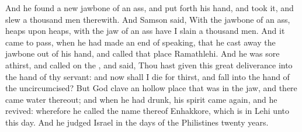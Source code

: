 \begin{biblechapter}
\verse And he found a new jawbone of an ass, and put forth his hand, and took it, and slew a thousand men therewith.
\verse And Samson said, With the jawbone of an ass, heaps upon heaps, with the jaw of an ass have I slain a thousand men.
\verse And it came to pass, when he had made an end of speaking, that he cast away the jawbone out of his hand, and called that place Ramathlehi.
\verse And he was sore athirst, and called on the \LORD, and said, Thou hast given this great deliverance into the hand of thy servant: and now shall I die for thirst, and fall into the hand of the uncircumcised?
\verse But God clave an hollow place that was in the jaw, and there came water thereout; and when he had drunk, his spirit came again, and he revived: wherefore he called the name thereof Enhakkore, which is in Lehi unto this day.
\verse And he judged Israel in the days of the Philistines twenty years.
\end{biblechapter}

